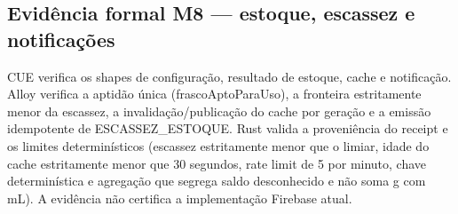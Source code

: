 \subsection*{Evidência formal M8 --- estoque, escassez e notificações}
CUE verifica os shapes de configuração, resultado de estoque, cache e notificação. Alloy verifica a aptidão única (frascoAptoParaUso), a fronteira estritamente menor da escassez, a invalidação/publicação do cache por geração e a emissão idempotente de ESCASSEZ\_ESTOQUE. Rust valida a proveniência do receipt e os limites determinísticos (escassez estritamente menor que o limiar, idade do cache estritamente menor que 30 segundos, rate limit de 5 por minuto, chave determinística e agregação que segrega saldo desconhecido e não soma g com mL). A evidência não certifica a implementação Firebase atual.
